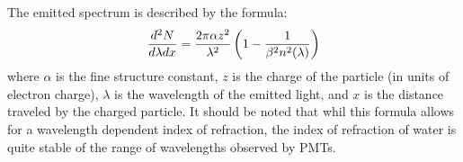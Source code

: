 The emitted spectrum is described by the formula\cite{Olive:2016xmw}:
 \begin{equation}
\frac{d^2N}{d\lambda dx}=\frac{2\pi \alpha z^2}{\lambda^2}\left(1-\frac{1}{\beta^2n^2(\lambda)}\right)
\label{eq:cherenkov_spectrum}
\end{equation}
where $\alpha$ is the fine structure constant, $z$ is the charge of the particle (in units of electron charge), $\lambda$ is the wavelength of the emitted light, and $x$ is the distance traveled by the charged particle.  It should be noted that whil this formula allows for a wavelength dependent index of refraction, the index of refraction of water is quite stable of the range of wavelengths observed by PMTs.   
